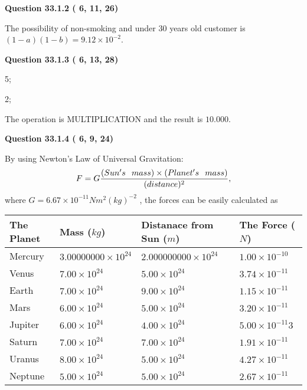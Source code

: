 \documentclass[12pt]{article}
\begin{document}
{\textbf{\large{Question
33.1.2 
 (          6,         11,         26)
}}}

The possibility of  %
 non-smoking and  %
under 30 years old
customer is $ (1-a)(1-b) =  %
9.12 \times 10^{-2} $.
  
  
{\textbf{\large{Question
33.1.3 
 (          6,         13,         28)
}}}

5;
 
2;
 
The operation is  %
MULTIPLICATION and the result is
$ %
10.000$.
 
  
  
{\textbf{\large{Question
33.1.4 
 (          6,          9,         24)
}}}

By using Newton's Law of Universal Gravitation:
\[
F=G \frac{(Sun's \hspace{0.1in} mass) \times (Planet's \hspace{0.1in} mass)} { (distance)^2},
\]
where
$ G= %
6.67 \times 10^{-11} N m^{2}(kg)^{-2}$ , the forces can be easily calculated as
 
\vspace{0.2in}
 
 
\begin{tabular}{|l|l|l|l|}
\hline
The Planet & Mass ($kg$) & Distanace from Sun ($m$) & The Force ($N$)\\
\hline
Mercury  &
           $ %
3.00000000 \times 10^{24}  $   &
             $ %
2.000000000 \times 10^{24}$    & $ %
1.00 \times 10^{-10} $
\\  \hline
Venus    &
           $  %
7.00 \times 10^{24}  $     &
             $ %
5.00 \times 10^{24} $    & $ %
3.74 \times 10^{-11} $
\\  \hline
Earth    &
           $  %
7.00 \times 10^{24}$     &
             $ %
9.00 \times 10^{24} $    & $ %
1.15 \times 10^{-11} $
\\   \hline
Mars     &
           $  %
6.00 \times 10^{24} $     &
             $ %
5.00 \times 10^{24}$    & $ %
3.20 \times 10^{-11} $
\\   \hline
Jupiter  &
           $  %
6.00 \times 10^{24}  $    &
             $ %
4.00 \times 10^{24} $    & $ %
5.00 \times 10^{-11}3 $
\\  \hline
Saturn   &
           $  %
7.00 \times 10^{24}   $    &
             $ %
7.00 \times 10^{24}  $    & $ %
1.91 \times 10^{-11} $
\\  \hline
Uranus   &
           $  %
8.00 \times 10^{24} $    &
             $ %
5.00 \times 10^{24}$    & $ %
4.27 \times 10^{-11} $
\\  \hline
Neptune  &
           $  %
5.00 \times 10^{24}  $    &
             $ %
5.00 \times 10^{24} $    & $ %
2.67 \times 10^{-11} $
\\  \hline
 
\end{tabular}
 
\end{document}
